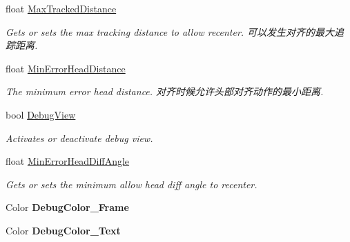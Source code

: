 \begin{DoxyCompactItemize}
float \mbox{\hyperlink{class_ximmerse_1_1_rhino_x_1_1_ground_plane_a9fdce85c8aa0f79d7a3bfd5e405690e6}{Max\+Tracked\+Distance}}
\begin{DoxyCompactList}\small\item\em Gets or sets the max tracking distance to allow recenter. 可以发生对齐的最大追踪距离. \end{DoxyCompactList}\item 
float \mbox{\hyperlink{class_ximmerse_1_1_rhino_x_1_1_ground_plane_a17e5a8401d6fff9932ee9be50a63557d}{Min\+Error\+Head\+Distance}}
\begin{DoxyCompactList}\small\item\em The minimum error head distance. 对齐时候允许头部对齐动作的最小距离. \end{DoxyCompactList}\item 
bool \mbox{\hyperlink{class_ximmerse_1_1_rhino_x_1_1_ground_plane_aae04f4e2f68e795bce517209568b90ef}{Debug\+View}}
\begin{DoxyCompactList}\small\item\em Activates or deactivate debug view. \end{DoxyCompactList}\item 
float \mbox{\hyperlink{class_ximmerse_1_1_rhino_x_1_1_ground_plane_a2b83cdffdc6141b39c695a0588b19568}{Min\+Error\+Head\+Diff\+Angle}}
\begin{DoxyCompactList}\small\item\em Gets or sets the minimum allow head diff angle to recenter. \end{DoxyCompactList}\item 
\mbox{\label{class_ximmerse_1_1_rhino_x_1_1_ground_plane_a88437781a9762727b2cd7ea8f931bdcb}} 
Color {\bfseries Debug\+Color\+\_\+\+Frame}
\item 
\mbox{\label{class_ximmerse_1_1_rhino_x_1_1_ground_plane_a9d37c7e36bbb00afc848ad540d2ff1e8}} 
Color {\bfseries Debug\+Color\+\_\+\+Text}

\end{DoxyCompactItemize}
